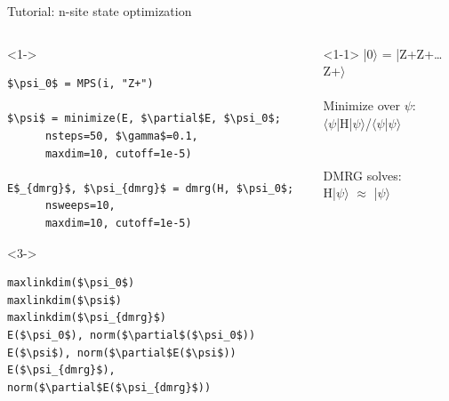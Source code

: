 \begin{frame}[fragile]{Tutorial: n-site state optimization}

\begin{columns}

\begin{column}{5cm}

\begin{onlyenv}<1->
\begin{lstlisting}[language=JuliaLocal, style=julia, mathescape, basicstyle=\small]
$\psi_0$ = MPS(i, "Z+")

$\psi$ = minimize(E, $\partial$E, $\psi_0$;
      nsteps=50, $\gamma$=0.1,
      maxdim=10, cutoff=1e-5)

E$_{dmrg}$, $\psi_{dmrg}$ = dmrg(H, $\psi_0$;
      nsweeps=10,
      maxdim=10, cutoff=1e-5)
\end{lstlisting}
\end{onlyenv}

\begin{onlyenv}<3->
\begin{lstlisting}[language=JuliaLocal, style=julia, mathescape, basicstyle=\small]
maxlinkdim($\psi_0$)
maxlinkdim($\psi$)
maxlinkdim($\psi_{dmrg}$)
E($\psi_0$), norm($\partial$($\psi_0$))
E($\psi$), norm($\partial$E($\psi$))
E($\psi_{dmrg}$), norm($\partial$E($\psi_{dmrg}$))
\end{lstlisting}
\end{onlyenv}

\end{column}

\begin{column}{5.5cm}

\begin{onlyenv}<1-1>
|0$\rangle$ = |Z+Z+…Z+$\rangle$ \\
~\\
Minimize over $\psi$: \\
$\langle\psi$|H|$\psi\rangle$/$\langle\psi$|$\psi\rangle$ \\
~\\
~\\
DMRG solves: \\
H|$\psi\rangle$ $\approx$ |$\psi\rangle$ \\
~\\
\end{onlyenv}


\end{column}
\end{columns}
\end{frame}
